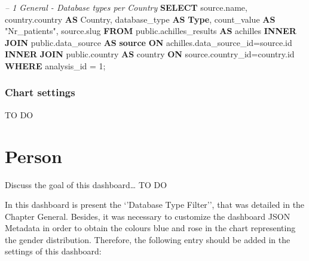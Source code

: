 \documentclass[]{book}
\newenvironment{Shaded}{\begin{snugshade}}{\end{snugshade}}
\newcommand{\KeywordTok}[1]{\textcolor[rgb]{0.13,0.29,0.53}{\textbf{#1}}}
\newcommand{\DataTypeTok}[1]{\textcolor[rgb]{0.13,0.29,0.53}{#1}}
\newcommand{\DecValTok}[1]{\textcolor[rgb]{0.00,0.00,0.81}{#1}}
\newcommand{\StringTok}[1]{\textcolor[rgb]{0.31,0.60,0.02}{#1}}
\newcommand{\CommentTok}[1]{\textcolor[rgb]{0.56,0.35,0.01}{\textit{#1}}}
\newcommand{\OtherTok}[1]{\textcolor[rgb]{0.56,0.35,0.01}{#1}}
\newcommand{\FunctionTok}[1]{\textcolor[rgb]{0.00,0.00,0.00}{#1}}
\newcommand{\ErrorTok}[1]{\textcolor[rgb]{0.64,0.00,0.00}{\textbf{#1}}}
\newcommand{\NormalTok}[1]{#1}
\begin{document}
\begin{Shaded}
\begin{Highlighting}[]
\CommentTok{-- 1    General - Database types per Country}
\KeywordTok{SELECT}\NormalTok{ source.name, }
\NormalTok{       country.country }\KeywordTok{AS}\NormalTok{ Country, }
\NormalTok{       database_type }\KeywordTok{AS} \KeywordTok{Type}\NormalTok{,}
\NormalTok{       count_value }\KeywordTok{AS} \OtherTok{"Nr_patients"}\NormalTok{,}
\NormalTok{       source.slug}
\KeywordTok{FROM}\NormalTok{ public.achilles_results }\KeywordTok{AS}\NormalTok{ achilles }
    \KeywordTok{INNER} \KeywordTok{JOIN}\NormalTok{ public.data_source }\KeywordTok{AS} \KeywordTok{source} \KeywordTok{ON} 
\NormalTok{      achilles.data_source_id=source.id}
    \KeywordTok{INNER} \KeywordTok{JOIN}\NormalTok{ public.country }\KeywordTok{AS}\NormalTok{ country }\KeywordTok{ON} 
\NormalTok{      source.country_id=country.id}
\KeywordTok{WHERE}\NormalTok{ analysis_id = }\DecValTok{1}\NormalTok{;}
\end{Highlighting}
\end{Shaded}

\subsection{Chart settings}\label{chart-settings-6}

TO DO

\chapter{Person}\label{person}

Discuss the goal of this dashboard\ldots{} TO DO

In this dashboard is present the `'Database Type Filter'', that was
detailed in the Chapter General. Besides, it was necessary to customize
the dashboard JSON Metadata in order to obtain the colours blue and rose
in the chart representing the gender distribution. Therefore, the
following entry should be added in the settings of this dashboard:

\begin{Shaded}
\end{Shaded}
\end{document}
